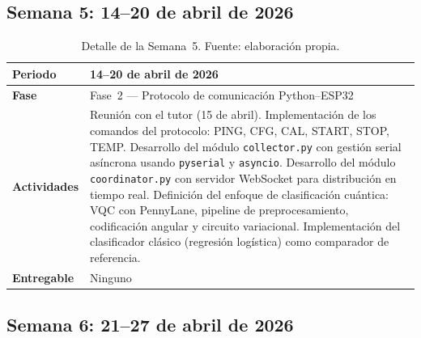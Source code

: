 \documentclass[11pt,a4paper,spanish]{book}
\begin{document}
\subsection{Semana 5: 14--20 de abril de 2026}

\begin{table}[ht]
\centering
\begin{tabular}{p{3cm} p{10cm}}
\hline\hline
\textbf{Periodo} & 14--20 de abril de 2026 \\ [0.5ex]
\hline
\textbf{Fase} & Fase~2 --- Protocolo de comunicaci\'{o}n Python--ESP32 \\ \hline
\textbf{Actividades} & Reuni\'{o}n con el tutor (15 de abril). Implementaci\'{o}n de los comandos del protocolo: PING, CFG, CAL, START, STOP, TEMP. Desarrollo del m\'{o}dulo \texttt{collector.py} con gesti\'{o}n serial as\'{i}ncrona usando \texttt{pyserial} y \texttt{asyncio}. Desarrollo del m\'{o}dulo \texttt{coordinator.py} con servidor WebSocket para distribuci\'{o}n en tiempo real. Definici\'{o}n del enfoque de clasificaci\'{o}n cu\'{a}ntica: VQC con PennyLane, pipeline de preprocesamiento, codificaci\'{o}n angular y circuito variacional. Implementaci\'{o}n del clasificador cl\'{a}sico (regresi\'{o}n log\'{i}stica) como comparador de referencia. \\ \hline
\textbf{Entregable} & Ninguno \\ \hline
\end{tabular}
\caption[Semana 5]{Detalle de la Semana~5. Fuente: elaboraci\'{o}n propia.}
\label{tab:semana5}
\end{table}

\subsection{Semana 6: 21--27 de abril de 2026}
\end{document}
